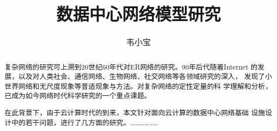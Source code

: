 \documentclass[phd]{jnuthesis}
\title{数据中心网络模型研究}
\author{韦小宝}
\institute{南京大学}
\begin{document}

\makenlctitle
\maketitle
\makeenglishtitle


\frontmatter

\begin{abstract}
复杂网络的研究可上溯到20世纪60年代对ER网络的研究。90年后代随着Internet
的发展，以及对人类社会、通信网络、生物网络、社交网络等各领域研究的深入，
发现了小世界网络和无尺度现象等普适现象与方法。对复杂网络的定性定量的科
学理解和分析，已成为如今网络时代科学研究的一个重点课题。

在此背景下，由于云计算时代的到来，本文针对面向云计算的数据中心网络基础
设施设计中的若干问题，进行了几方面的研究。………………
\end{abstract}

\begin{englishabstract}
\blindtext
\end{englishabstract}
\end{document}
